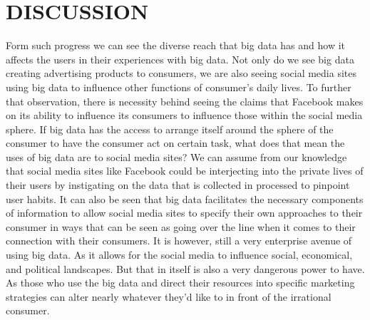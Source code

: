 \documentclass[sigconf]{acmart}
\begin{document}
\section{DISCUSSION}
Form such progress we can see the diverse reach that big data has and how it affects the users in their experiences with big data. Not only do we see big data creating advertising products to consumers, we are also seeing social media sites using big data to influence other functions of consumer’s daily lives. To further that observation, there is necessity behind seeing the claims that Facebook makes on its ability to influence its consumers to influence those within the social media sphere. If big data has the access to arrange itself around the sphere of the consumer to have the consumer act on certain task, what does that mean the uses of big data are to social media sites? We can assume from our knowledge that social media sites like Facebook could be interjecting into the private lives of their users by instigating on the data that is collected in processed to pinpoint user habits. It can also be seen that big data facilitates the necessary components of information to allow social media sites to specify their own approaches to their consumer in ways that can be seen as going over the line when it comes to their connection with their consumers. It is however, still a very enterprise avenue of using big data. As it allows for the social media to influence social, economical, and political landscapes. But that in itself is also a very dangerous power to have. As those who use the big data and direct their resources into specific marketing strategies can alter nearly whatever they’d like to in front of the irrational consumer. \\
\end{document}
